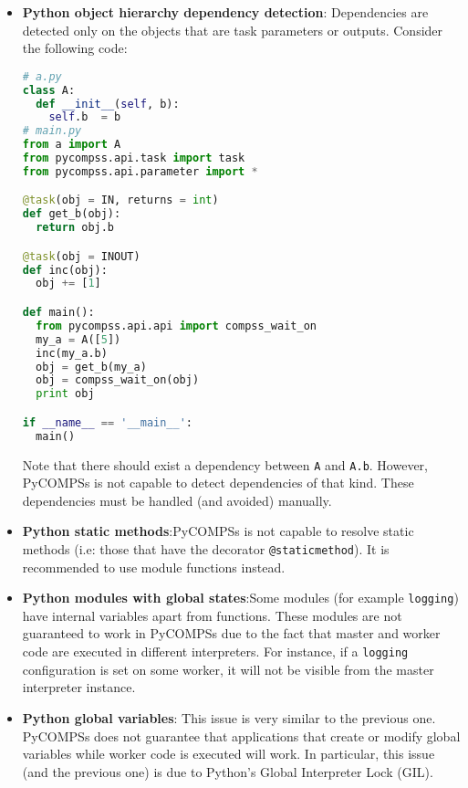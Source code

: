 \begin{itemize}
\item \textbf{Python object hierarchy dependency detection}: \newline Dependencies are detected only on the objects that are task 
parameters or outputs. Consider the following code:
\begin{lstlisting}[language=python]
# a.py
class A:
  def __init__(self, b):
    self.b  = b
# main.py
from a import A
from pycompss.api.task import task
from pycompss.api.parameter import *

@task(obj = IN, returns = int)
def get_b(obj):
  return obj.b

@task(obj = INOUT)
def inc(obj):
  obj += [1]

def main():
  from pycompss.api.api import compss_wait_on
  my_a = A([5])
  inc(my_a.b)
  obj = get_b(my_a)
  obj = compss_wait_on(obj)
  print obj

if __name__ == '__main__':
  main()            
\end{lstlisting}
Note that there should exist a dependency between \verb|A| and \verb|A.b|. However, PyCOMPSs is not capable
to detect dependencies of that kind. These dependencies
must be handled (and avoided) manually.

\item \textbf{Python static methods}:\newline PyCOMPSs is not capable to resolve static methods (i.e: those that have the decorator
\verb|@staticmethod|). It is recommended to use module functions
instead.

\item \textbf{Python modules with global states}:\newline Some modules (for example \verb|logging|) have internal variables apart from functions. 
These modules are not guaranteed to work in PyCOMPSs due to the fact that master and worker code are executed in different interpreters. For instance, if a \verb|logging| configuration is set on some
worker, it will not be visible from the master interpreter instance.

\item \textbf{Python global variables}:\newline
This issue is very similar to the previous one. PyCOMPSs does not guarantee that applications that create or modify global variables while
worker code is executed will work. In particular, this issue (and the previous one) is due to Python's Global Interpreter Lock (GIL).


\end{itemize}
